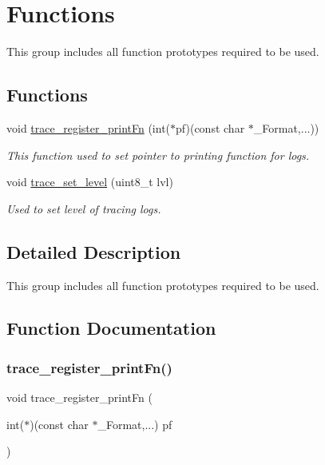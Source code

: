 \hypertarget{group__dbg__logs__group__functions}{}\section{Functions}
\label{group__dbg__logs__group__functions}


This group includes all function prototypes required to be used.  


\subsection*{Functions}
\begin{DoxyCompactItemize}
\item 
void \mbox{\hyperlink{group__dbg__logs__group__functions_ga8ed207793866a85cd64883e538573fb4}{trace\+\_\+register\+\_\+print\+Fn}} (int($\ast$pf)(const char $\ast$\+\_\+\+Format,...))
\begin{DoxyCompactList}\small\item\em This function used to set pointer to printing function for logs. \end{DoxyCompactList}\item 
void \mbox{\hyperlink{group__dbg__logs__group__functions_ga6659e7cfd41f22f3d2c070c4c1156da4}{trace\+\_\+set\+\_\+level}} (uint8\+\_\+t lvl)
\begin{DoxyCompactList}\small\item\em Used to set level of tracing logs. \end{DoxyCompactList}\end{DoxyCompactItemize}


\subsection{Detailed Description}
This group includes all function prototypes required to be used. 



\subsection{Function Documentation}
\mbox{\label{group__dbg__logs__group__functions_ga8ed207793866a85cd64883e538573fb4}} 
\subsubsection{\texorpdfstring{trace\_register\_printFn()}{trace\_register\_printFn()}}
{\footnotesize\ttfamily void trace\+\_\+register\+\_\+print\+Fn (\begin{DoxyParamCaption}\item[{int($\ast$)(const char $\ast$\+\_\+\+Format,...)}]{pf }\end{DoxyParamCaption})}



